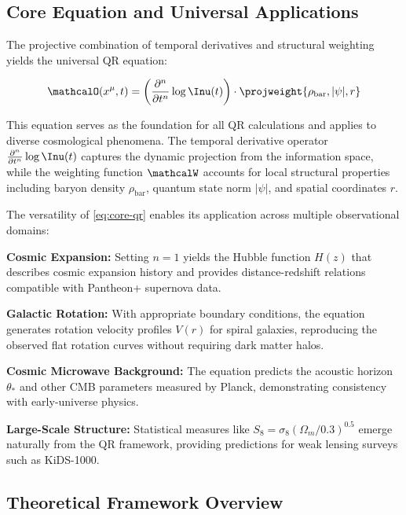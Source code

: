 \subsection{Core Equation and Universal Applications}
\label{subsec:core-equation}

The projective combination of temporal derivatives and structural weighting yields the universal QR equation:

\begin{equation}
\mathcalO(x^\mu, t) = \left(\frac{\partial^n}{\partial t^n} \log \Inu(t)\right) \cdot \projweight{\rho_{\text{bar}}, |\psi|, r}
\label{eq:core-qr}
\end{equation}

This equation serves as the foundation for all QR calculations and applies to diverse cosmological phenomena. The temporal derivative operator $\frac{\partial^n}{\partial t^n} \log \Inu(t)$ captures the dynamic projection from the information space, while the weighting function $\mathcalW$ accounts for local structural properties including baryon density $\rho_{\text{bar}}$, quantum state norm $|\psi|$, and spatial coordinates $r$.

The versatility of \cref{eq:core-qr} enables its application across multiple observational domains:

\textbf{Cosmic Expansion:} Setting $n=1$ yields the Hubble function $H(z)$ that describes cosmic expansion history and provides distance-redshift relations compatible with Pantheon+ supernova data.

\textbf{Galactic Rotation:} With appropriate boundary conditions, the equation generates rotation velocity profiles $V(r)$ for spiral galaxies, reproducing the observed flat rotation curves without requiring dark matter halos.

\textbf{Cosmic Microwave Background:} The equation predicts the acoustic horizon $\theta_*$ and other CMB parameters measured by Planck, demonstrating consistency with early-universe physics.

\textbf{Large-Scale Structure:} Statistical measures like $S_8 = \sigma_8(\Omega_m/0.3)^{0.5}$ emerge naturally from the QR framework, providing predictions for weak lensing surveys such as KiDS-1000.

\subsection{Theoretical Framework Overview}
\label{subsec:framework-overview}

